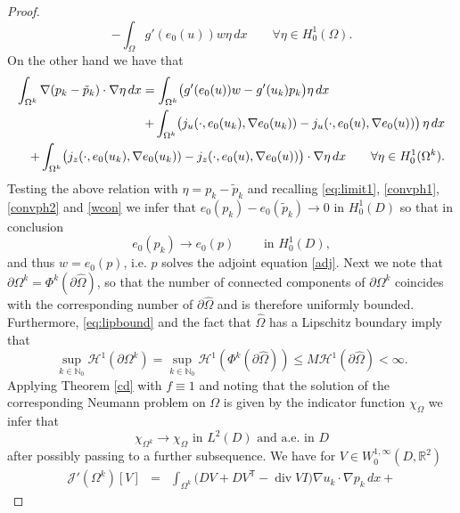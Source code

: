 \documentclass[a4paper,10pt]{article}
\newcommand{\dx}{\,dx}
\newcommand{\Omref}{\hat \Omega}
\theoremstyle{plain}
\theoremstyle{plain}
\numberwithin{equation}{section}
\DeclareMathOperator{\Div}{div}
\begin{document}
\begin{proof}
\begin{displaymath}
-  \int_{\Omega} g'(e_0(u)) w \eta \dx\qquad\forall \eta \in H^1_0(\Omega).
\end{displaymath}
On the other hand we have that
\begin{eqnarray*}
\lefteqn{ 
\int_{\Omega^k} \nabla (p_k - \tilde p_k) \cdot \nabla \eta  \dx =
\int_{\Omega^k} \bigl( g'(e_0(u)) w - g'(u_k) p_k \bigr) \eta \dx }  \\
& & +   \int_{\Omega^k} \bigl( j_u(\cdot,e_0(u_k),\nabla e_0(u_k))-
j_u(\cdot,e_0(u),\nabla e_0(u)) \bigr) \, \eta  \dx  \\
& & + \int_{\Omega^k} \bigl( j_z(\cdot,e_0(u_k),\nabla e_0(u_k)) - j_z(\cdot,e_0(u), \nabla e_0(u)) \bigr) \cdot \nabla \eta  \dx \qquad\forall \eta \in H^1_0(\Omega^k).
\end{eqnarray*} 
Testing the above relation with $\eta=p_k - \tilde p_k$ and
recalling \eqref{eq:limit1}, \eqref{convph1}, \eqref{convph2} and \eqref{wcon} we infer that 
$e_0(p_k) - e_0(\tilde p_k) \rightarrow 0$ in $H^1_0(D)$ so that in conclusion 
\begin{equation} \label{eq:limit2}
e_0(p_k) \rightarrow e_0(p) \qquad \mbox{ in }  H^1_0(D), 
\end{equation}
and thus $w=e_0(p)$, i.e. $p$ solves the adjoint equation \eqref{adj}.
Next we note that $\partial \Omega^k = \Phi^k(\partial \Omref)$, so that the number of connected components of $\partial \Omega^k$
coincides with the corresponding number of $\partial \Omref$ and
is therefore uniformly bounded. Furthermore, \eqref{eq:lipbound} and the fact that $\Omref$ has a Lipschitz boundary imply that
\begin{displaymath}
\sup_{k \in \mathbb N_0} \mathcal H^1(\partial \Omega^k) = \sup_{k \in \mathbb N_0}  \mathcal H^1(\Phi^k(\partial \Omref)) \leq M  \mathcal H^1(\partial \Omref) < \infty.
\end{displaymath}
Applying Theorem \ref{cd} with $f \equiv 1$ and noting that the solution of the corresponding Neumann problem on $\Omega$ is given by the indicator function $\chi_\Omega$ we infer that 
\begin{equation} \label{indicator}
\chi_{\Omega^k} \rightarrow \chi_{\Omega} \mbox{ in } L^2(D) \mbox{ and a.e. in  } D
\end{equation}
after possibly passing to a further subsequence. 
We have for $V \in W^{1,\infty}_0(D,\mathbb R^2)$
\begin{eqnarray}
\mathcal J'(\Omega^k)[V]  &= &  \int_{\Omega^k} 
\bigl( DV + D V^{\mathsf{T}} - \Div V I \bigr)  \nabla u_k \cdot \nabla p_k   \dx + 

\end{eqnarray}
\end{proof}
\end{document}
